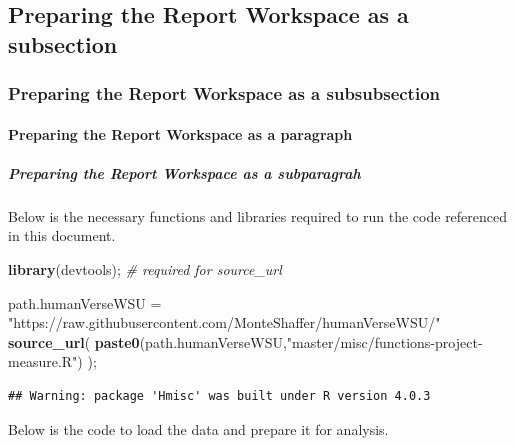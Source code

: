 \documentclass[]{article}
\newenvironment{Shaded}{\begin{snugshade}}{\end{snugshade}}
\newcommand{\CommentTok}[1]{\textcolor[rgb]{0.56,0.35,0.01}{\textit{#1}}}
\newcommand{\KeywordTok}[1]{\textcolor[rgb]{0.13,0.29,0.53}{\textbf{#1}}}
\newcommand{\NormalTok}[1]{#1}
\newcommand{\StringTok}[1]{\textcolor[rgb]{0.31,0.60,0.02}{#1}}
\begin{document}
\newpage

\subsection{Preparing the Report Workspace as a subsection}
\label{sec:appendix-setup}

\subsubsection{Preparing the Report Workspace as a subsubsection}
\label{sec:appendix-setup2}

\paragraph{Preparing the Report Workspace as a paragraph}
\label{sec:appendix-setup3}

\subparagraph{Preparing the Report Workspace as a subparagrah}
\label{sec:appendix-setup4}

Below is the necessary functions and libraries required to run the code
referenced in this document.

\begin{Shaded}
\begin{Highlighting}[]
\KeywordTok{library}\NormalTok{(devtools);       }\CommentTok{\# required for source\_url}

\NormalTok{path.humanVerseWSU =}\StringTok{ "https://raw.githubusercontent.com/MonteShaffer/humanVerseWSU/"}
\KeywordTok{source\_url}\NormalTok{( }\KeywordTok{paste0}\NormalTok{(path.humanVerseWSU,}\StringTok{"master/misc/functions{-}project{-}measure.R"}\NormalTok{) );}
\end{Highlighting}
\end{Shaded}

\begin{verbatim}
## Warning: package 'Hmisc' was built under R version 4.0.3
\end{verbatim}

Below is the code to load the data and prepare it for analysis.
\end{document}
